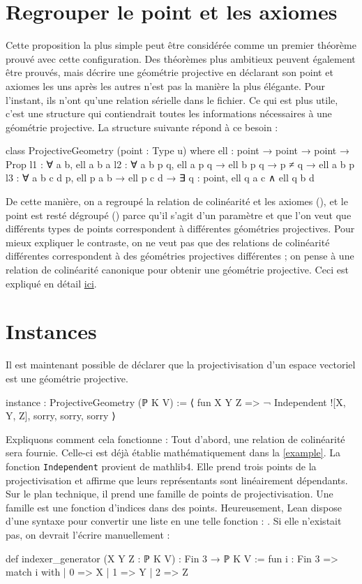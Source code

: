 \documentclass[12pt, oneside]{memoir}
\theoremstyle{definition}
\theoremstyle{remark}
\begin{document}
\section{Regrouper le point et les axiomes}
Cette proposition la plus simple peut être considérée comme un premier théorème
prouvé avec cette configuration. Des théorèmes plus ambitieux peuvent également
être prouvés, mais décrire une géométrie projective en déclarant son point et
axiomes les uns après les autres n'est pas la manière la plus élégante. Pour
l'instant, ils n'ont qu'une relation sérielle dans le fichier. Ce qui est plus
utile, c'est une structure qui contiendrait toutes les informations nécessaires
à une géométrie projective. La structure suivante répond à ce besoin :
\begin{leancode}
class ProjectiveGeometry (point : Type u) where
ell : point → point → point → Prop
l1  : ∀ a b, ell a b a
l2  : ∀ a b p q, ell a p q → ell b p q → p ≠ q → ell a b p
l3  : ∀ a b c d p, ell p a b → ell p c d → ∃ q : point, ell q a c ∧ ell q b d
\end{leancode}
De cette manière, on a regroupé la relation de colinéarité et les axiomes
(), et le point est resté dégroupé () parce qu'il
s'agit d'un paramètre et que l'on veut que différents types de points
correspondent à différentes géométries projectives. Pour mieux expliquer le
contraste, on ne veut pas que des relations de colinéarité différentes
correspondent à des géométries projectives différentes ; on pense à une relation
de colinéarité canonique pour obtenir une géométrie projective. Ceci est
expliqué en détail
\href{https://leanprover.zulipchat.com/#narrow/stream/113489-new-members/topic/Creating.20a.20higher.20level.20object/near/423444220}{ici}.
\section{Instances}
Il est maintenant possible de déclarer que la projectivisation d'un espace
vectoriel est une géométrie projective.
\begin{leancode}
instance : ProjectiveGeometry (ℙ K V) :=
⟨
fun X Y Z => ¬ Independent ![X, Y, Z],
sorry,
sorry,
sorry
⟩
\end{leancode}
Expliquons comment cela fonctionne : Tout d'abord, une relation de colinéarité
sera fournie. Celle-ci est déjà établie mathématiquement dans la \cref{example}.
La fonction \texttt{Independent} provient de mathlib4. Elle prend trois points
de la projectivisation et affirme que leurs représentants sont linéairement
dépendants. Sur le plan technique, il prend une famille de points de
projectivisation. Une famille est une fonction d'indices dans des points.
Heureusement, Lean dispose d'une syntaxe pour convertir une liste en une telle
fonction : \say{\texttt{!}}. Si elle n'existait pas, on devrait l'écrire
manuellement :
\begin{leancode}
def indexer_generator (X Y Z : ℙ K V) : Fin 3 → ℙ K V :=
fun i : Fin 3 => match i with
| 0 => X
| 1 => Y
| 2 => Z
\end{leancode}
\end{document}

